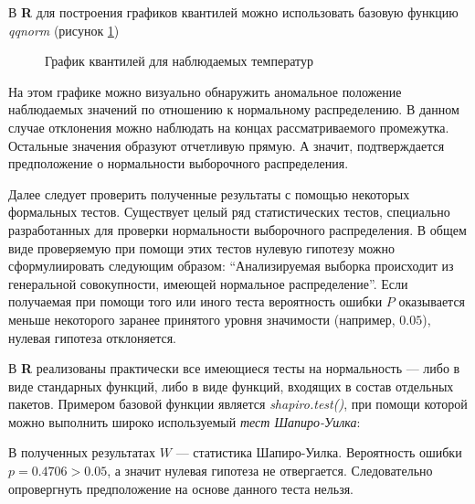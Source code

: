 В \textbf{R} для построения графиков квантилей можно использовать базовую функцию \textit{qqnorm} (рисунок \ref{img:qqnorm})
\begin{figure}[ht]
\caption{График квантилей для наблюдаемых температур}
\label{img:qqnorm}
\end{figure}
На этом графике можно визуально обнаружить аномальное положение наблюдаемых значений по отношению к нормальному распределению. В данном случае отклонения можно наблюдать на концах рассматриваемого промежутка. Остальные значения образуют отчетливую прямую. А значит, подтверждается предположение о нормальности выборочного распределения.

Далее следует проверить полученные результаты с помощью некоторых формальных тестов. Существует целый ряд статистических тестов, специально разработанных для проверки нормальности выборочного распределения. В общем виде проверяемую при помощи этих тестов нулевую гипотезу можно сформулиировать следующим образом: ``Анализируемая выборка происходит из генеральной совокупности, имеющей нормальное распределение''. Если получаемая при помощи того или иного теста вероятность ошибки $P$ оказывается меньше некоторого заранее принятого уровня значимости (например, $0.05$), нулевая гипотеза отклоняется.

В \textbf{R} реализованы практически все имеющиеся тесты на нормальность --- либо в виде стандарных функций, либо в виде функций, входящих в состав отдельных пакетов. Примером базовой функции является \textit{shapiro.test()}, при помощи которой можно выполнить широко используемый \textit{тест Шапиро-Уилка}:

В полученных результатах $W$ --- статистика Шапиро-Уилка. Вероятность ошибки $p = 0.4706 > 0.05$, а значит нулевая гипотеза не отвергается. Следовательно опровергнуть предположение на основе данного теста нельзя.

